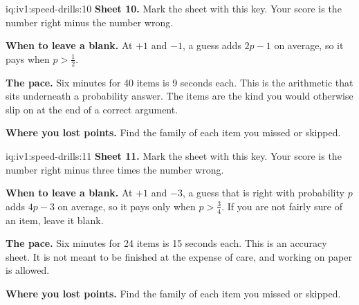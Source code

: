 \begin{solution}{iq:iv1:speed-drills:10}
\textbf{Sheet 10.} Mark the sheet with this key. Your score is the number right minus the number wrong.
\par\nopagebreak


\textbf{When to leave a blank.} At $+1$ and $-1$, a guess adds $2p - 1$ on average, so it pays when $p > \tfrac12$.

\textbf{The pace.} Six minutes for 40 items is 9 seconds each. This is the arithmetic that sits underneath a probability answer. The items are the kind you would otherwise slip on at the end of a correct argument.

\textbf{Where you lost points.} Find the family of each item you missed or skipped.


\end{solution}

\begin{solution}{iq:iv1:speed-drills:11}
\textbf{Sheet 11.} Mark the sheet with this key. Your score is the number right minus three times the number wrong.
\par\nopagebreak


\textbf{When to leave a blank.} At $+1$ and $-3$, a guess that is right with probability $p$ adds $4p - 3$ on average, so it pays only when $p > \tfrac34$. If you are not fairly sure of an item, leave it blank.

\textbf{The pace.} Six minutes for 24 items is 15 seconds each. This is an accuracy sheet. It is not meant to be finished at the expense of care, and working on paper is allowed.

\textbf{Where you lost points.} Find the family of each item you missed or skipped.


\end{solution}

